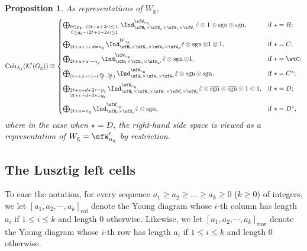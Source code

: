 \documentclass[12pt,a4paper]{amsart}
\newcommand{\CK}{{\mathcal {K}}}
\newcommand{\sgn}{\operatorname{sgn}}
\numberwithin{equation}{section}
\newtheorem{prop}[thm]{Proposition}
\theoremstyle{remark}
\def\bsgn{\overline{\sgn}}
\def\Coh{\mathrm{Coh}}
\begin{document}
\begin{prop}\label{count004}
As representations of $W_\mathrm g$,
    \[
       \Coh_{\Lambda_\mathrm g}(\CK'(G_\mathrm g)) \cong
        \begin{cases}
     \bigoplus_{\substack{0\leq p_\mathrm g-(2t+a+2r)\leq 1,\\0\leq q_\mathrm g - (2t+a+2s)\leq 1}} \Ind_{\sfH_{t} \times \sfS_{a}\times \sfW_s\times \sfW_r}^{\sfW_{n_\mathrm g}}
         \tilde{\varepsilon} \otimes 1 \otimes \sgn \otimes \sgn, &  \text{if $\star=B$}; \medskip\\
     \bigoplus_{2t+a+c+d=n_\mathrm g}\Ind_{\sfH_{t} \times \sfS_{a} \times \sfW_c\times \sfW_d}^{W_{n_\mathrm g}}\tilde{\varepsilon} \otimes
          \sgn \otimes 1 \otimes 1, &  \text{if $\star =C$};\medskip \\
          \bigoplus_{2t+a+a'=n_\mathrm g}\Ind_{\sfH_{t} \times \sfS_{a} \times \sfS_{a'}}^{\sfW_{n_\mathrm g}}\tilde{\varepsilon} \otimes
          \sgn \otimes 1, &  \text{if $\star =\wtC$};\medskip \\
          \bigoplus_{\substack{(t+s,t+r)=(\frac{p_\mathrm g}{2},\frac{q_\mathrm g}{2})}} \Ind_{\sfH_{t} \times \sfW_s\times \sfW_t}^{\sfW_{n_\mathrm g}}
         \tilde{\varepsilon} \otimes \sgn \otimes \sgn, &  \text{if $\star =C^*$}; \medskip\\
        \bigoplus_{\substack{2t+c+d+2r=p_\mathrm g\\2t+c+d+2s=q_\mathrm g}}
          \Ind_{\sfH_{t} \times \sfW_s\times \sfW_r\times \sfW'_{c}\times \sfW_{d} }^{\sfW_{n_\mathrm g}}\tilde{\varepsilon} \otimes \bsgn \otimes \bsgn \otimes 1\otimes
          1, &  \text{if $\star =D$}; \medskip \\
          \bigoplus_{\substack{2t+a=n_\mathrm g}} \Ind_{\sfH_{t} \times \sfS_{a}}^{\sfW'_{n_\mathrm g}}
         \tilde{\varepsilon} \otimes \sgn, &  \text{if $\star =D^*$}, \\
     \end{cases}
       \]
       where in the case when $\star=D$,  the right-hand side space is viewed as a representation of $W_\mathrm g=\sfW_{n_\mathrm g}'$ by restriction.
      \end{prop}



   \subsection{The Lusztig  left cells}
  \label{sec:LCBCD}

To ease the notation, for every sequence $a_1\geq a_2\geq \dots \geq a_k\geq 0$ ($k\geq 0$) of integers,   we let $[a_1, a_2, \cdots, a_k]_{\mathrm{col}}$ denote the Young diagram
whose $i$-th column has length $a_i$ if $1 \leq i \leq k$ and length $0$
otherwise. Likewise, we let $[a_1, a_2, \cdots, a_k]_{\mathrm{row}}$ denote the Young diagram
whose $i$-th  row has length $a_i$ if $1 \leq i \leq k$ and length $0$ otherwise.
\end{document}
